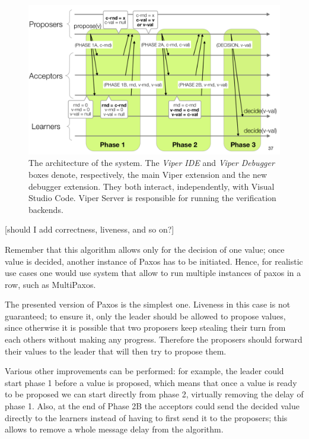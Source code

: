 \begin{figure}[htb]
\centering
\includegraphics[width=\textwidth,height=\textheight,keepaspectratio]{img/paxos.png}

\caption[The architecture of the system]{ The architecture of the system. The
  \textit{Viper IDE} and \textit{Viper Debugger} boxes denote, respectively,
  the main Viper extension and the new debugger extension. They both interact,
  independently, with Visual Studio Code. Viper Server is responsible for
  running the verification backends.}
\label{fig:paxos}
\end{figure}

[should I add correctness, liveness, and so on?]

Remember that this algorithm allows only for the decision of one value; once value is decided, another instance of Paxos has to be initiated. Hence, for realistic use cases one would use system that allow to run multiple instances of paxos in a row, such as MultiPaxos.

The presented version of Paxos is the simplest one. Liveness in this case is not guaranteed; to ensure it, only the leader should be allowed to propose values, since otherwise it is possible that two proposers keep stealing their turn from each others without making any progress. Therefore the proposers should forward their values to the leader that will then try to propose them.

Various other improvements can be performed: for example, the leader could start phase 1 before a value is proposed, which means that once a value is ready to be proposed we can start directly from phase 2, virtually removing the delay of phase 1.
Also, at the end of Phase 2B the acceptors could send the decided value directly to the learners instead of having to first send it to the proposers; this allows to remove a whole message delay from the algorithm.


